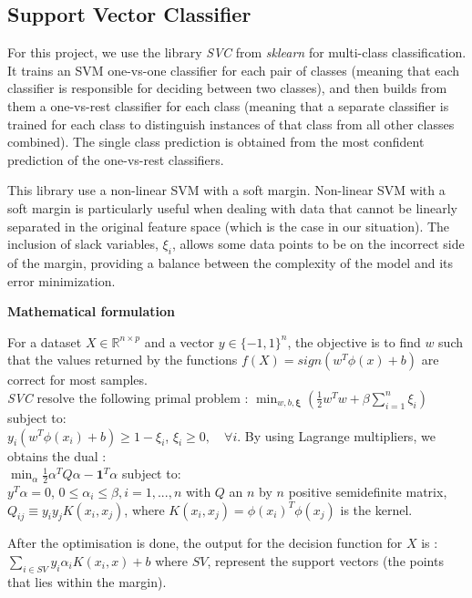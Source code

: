 \documentclass[twocolumn]{article}
\newcommand{\R}{\mathbb{R}}
\begin{document}
\subsection{Support Vector Classifier}
\label{4.3}
For this project, we use the library \textit{SVC} from \textit{sklearn} for multi-class classification. It trains an SVM one-vs-one classifier for each pair of classes (meaning that each classifier is responsible for deciding between two classes), and then builds from them a one-vs-rest classifier for each class (meaning that a separate classifier is trained for each class to distinguish instances of that class from all other classes combined). The single class prediction is obtained from the most confident prediction of the one-vs-rest classifiers.  

This library use a non-linear SVM with a soft margin. Non-linear SVM with a soft margin is particularly useful when dealing with data that cannot be linearly separated in the original feature space (which is the case in our situation). The inclusion of slack variables, \(\xi_i\), allows some data points to be on the incorrect side of the margin, providing a balance between the complexity of the model and its error minimization.

\textbf{Mathematical formulation}

For a dataset $X \in \R^{n \times p}$ and a vector $y \in \{-1, 1\}^n$, the objective is to find $w$ such that the values returned by the functions $f(X) = sign(w^T\phi(x) + b)$ are correct for most samples.\\
\textit{SVC} resolve the following primal problem : \(\displaystyle
\min_{w, b, \boldsymbol{\xi}} \left( \frac{1}{2} w^T w + \beta \sum_{i=1}^{n} \xi_i \right)
\) 
subject to:\\
\( y_i (w^T \phi(x_i) + b) \geq 1 - \xi_i\), \(\xi_i \geq 0, \quad \forall i\).
By using Lagrange multipliers, we obtains the dual :\\
\(\displaystyle \min_{\alpha} \frac{1}{2} \alpha^T Q \alpha - \mathbf{1}^T \alpha
\) subject to:\\
\(y^T \alpha = 0\), \(0 \leq \alpha_i \leq \beta, i=1,...,n\) with $Q$ an $n$ by $n$ positive semidefinite matrix, $Q_{ij} \equiv y_iy_jK(x_i, x_j)$, where $K(x_i, x_j) = \phi(x_i)^T\phi(x_j)$ is the kernel. 

After the optimisation is done, the output for the decision function for $X$ is :\(\displaystyle \sum_{i\in SV} y_i\alpha_i K(x_i, x) + b\)
where $SV$, represent the support vectors (the points that lies within the margin).
\end{document}
